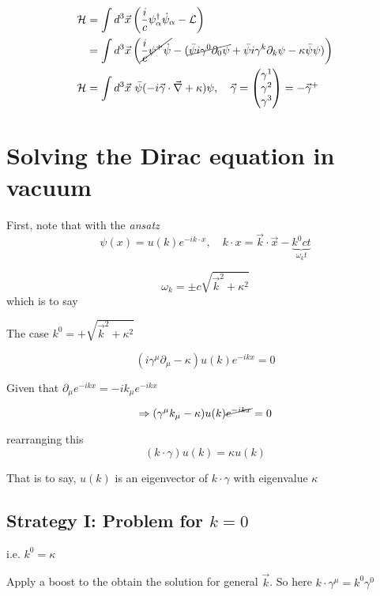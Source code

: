 \documentclass[11pt]{article}
\newcommand{\lag}{\mathcal{L}}
\newcommand{\ham}{\mathcal{H}}
\begin{document}
	
	\begin{align*}
		\ham &= \int d^3 \vec{x} \left( \frac{i}{c}\psi^\dagger_\alpha \dot{\psi}_\alpha - \lag \right)\\
			& = \int d^3 \vec{x} \left( \cancel{ \frac{i}{c}\psi^+ \dot{\psi} }- (  \cancel{ \bar{\psi}i\gamma^0 \partial_0\psi } + \bar{\psi} i \gamma^k \partial_k \psi - \kappa \bar{\psi} \psi) \right)\\
		\ham &= \int d^3 \vec{x}\ \bar{\psi} (-i\vec{\gamma}\cdot \vec{\nabla} + \kappa)\psi, \quad \vec{\gamma} = \begin{pmatrix}
			\gamma^1 \\ \gamma^2 \\ \gamma^3
		\end{pmatrix} = -\vec{\gamma}^+
	\end{align*}
	
	
	
	\section*{Solving the Dirac equation in vacuum}
	
	First, note that with the {\it ansatz} \[ \psi(x) = u(k) e^{-ik\cdot x},\quad k\cdot x = \vec{k}\cdot\vec{x} - \underbrace{k^0 ct}_{\omega_k t} \]
	
	\[ \omega_k = \pm c\sqrt{\vec{k}^2 + \kappa^2 }\]
	which is to say
	
	\begin{center} \end{center}
	
	
	The case $k^0 = + \sqrt{\vec{k}^2 + \kappa^2}$
	
	\[ (i\gamma^\mu\partial_\mu - \kappa) u(k) e^{-ikx} = 0\]
	
	Given that $\partial_\mu e^{-ikx} = -ik_\mu e^{-ikx}$
	
	\[ \Rightarrow (\gamma^\mu k_\mu - \kappa) u(k) \cancel{e^{-ikx}} = 0\]
	
	rearranging this
	\[ (k \cdot \gamma) u(k) = \kappa u(k)\]
	
	That is to say, $u(k)$ is an eigenvector of $k\cdot\gamma$ with eigenvalue $\kappa$
	
	\subsection*{Strategy I: Problem for $k=0$}
	i.e. $k^0 = \kappa$
	
	Apply a boost to the obtain the solution for general $\vec{k}$. So here $k\cdot \gamma^\mu = k^0\gamma^0$
	
\end{document}
